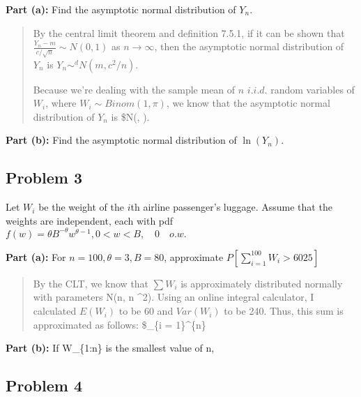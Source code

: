 \documentclass[
]{article}
\begin{document}
\textbf{Part (a):} Find the asymptotic normal distribution of \(Y_n\).

\begin{quote}
By the central limit theorem and definition 7.5.1, if it can be shown
that \(\frac{Y_n - m}{c/\sqrt{n}} \sim N(0,1)\) as
\(n \rightarrow \infty\), then the asymptotic normal distribution of
\(Y_n\) is \(Y_n \sim^d N(m, c^2/n)\).

Because we're dealing with the sample mean of \(n\) \(i.i.d.\) random
variables of \(W_i\), where \(W_i \sim Binom(1,\pi)\), we know that the
asymptotic normal distribution of \(Y_n\) is \$N(\pi,
).
\end{quote}

\textbf{Part (b):} Find the asymptotic normal distribution of
\(\ln(Y_n)\).

\hypertarget{problem-3}{%
\subsection{Problem 3}\label{problem-3}}

Let \(W_i\) be the weight of the \(i\)th airline passenger's luggage.
Assume that the weights are independent, each with pdf
\(f(w) = \theta B^{-\theta} w^{\theta-1}, 0 < w < B, \quad 0 \quad o.w.\)

\textbf{Part (a):} For \(n = 100, \theta = 3, B = 80\), approximate
\(P\left[\sum_{i = 1}^{100} W_i > 6025\right]\)

\begin{quote}
By the CLT, we know that \(\sum W_i\) is approximately distributed
normally with parameters N(n\mu, n \sigma\^{}2). Using an online
integral calculator, I calculated \(E(W_i)\) to be 60 and \(Var(W_i)\)
to be 240. Thus, this sum is approximated as follows: \$\sum\_\{i =
1\}\^{}\{n\}
\end{quote}

\textbf{Part (b):} If W\_\{1:n\} is the smallest value of n,

\hypertarget{problem-4}{%
\subsection{Problem 4}\label{problem-4}}
\end{document}
